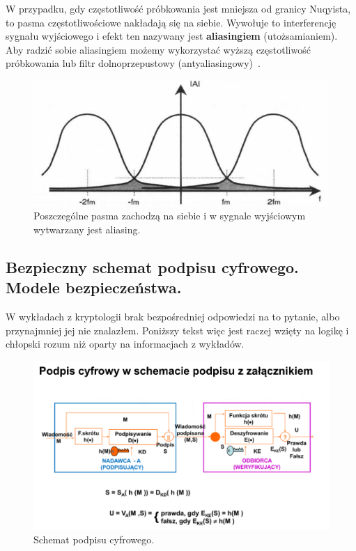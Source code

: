 \documentclass[wi]{zut}
\begin{document}
W przypadku, gdy częstotliwość próbkowania jest mniejsza od granicy Nuqyista, to pasma częstotliwościowe nakładają się na siebie. Wywołuje to interferencję sygnału wyjściowego i efekt ten nazywany jest \textbf{aliasingiem} (utożsamianiem). Aby radzić sobie aliasingiem możemy wykorzystać wyższą częstotliwość próbkowania lub filtr dolnoprzepustowy (antyaliasingowy)~\cite{Cariow_3}.

\begin{figure}[H]
    \centering
    \includegraphics[width=0.7\linewidth]{images/aliasign.png}
    \caption{Poszczególne pasma zachodzą na siebie i w sygnale wyjściowym wytwarzany jest aliasing.}
    \label{fig:aliasign}
\end{figure}


\subsection{Bezpieczny schemat podpisu cyfrowego. Modele bezpieczeństwa.}

W wykładach z kryptologii brak bezpośredniej odpowiedzi na to pytanie, albo przynajmniej jej nie znalazłem. Poniższy tekst więc jest raczej wzięty na logikę i chłopski rozum niż oparty na informacjach z wykładów.

\begin{figure}[H]
    \centering
    \includegraphics[width=0.7\linewidth]{images/podpis_cyfrowy.png}
    \caption{Schemat podpisu cyfrowego.}
    \label{fig:digital_signature}
\end{figure}
\end{document}
